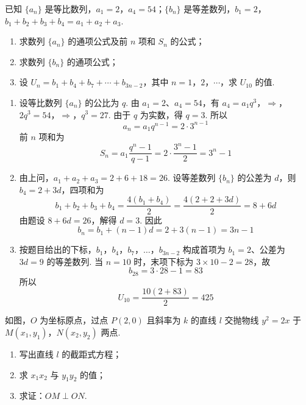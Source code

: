 \begin{problem}
已知 \(\{a_n\}\) 是等比数列，\(a_1=2\)，\(a_4=54\)；\(\{b_n\}\) 是等差数列，\(b_1=2\)，\(b_1+b_2+b_3+b_4=a_1+a_2+a_3\).

\begin{enumerate}
\item 求数列 \(\{a_n\}\) 的通项公式及前 \(n\) 项和 \(S_n\) 的公式；
\item 求数列 \(\{b_n\}\) 的通项公式；
\item 设 \(U_n=b_1+b_4+b_7+\cdots+b_{3n-2}\)，其中 \(n=1\)，\(2\)，\(\cdots\)，求 \(U_{10}\) 的值.
\end{enumerate}
\end{problem}

\begin{solution}
\begin{enumerate}
\item 设等比数列 \(\{a_n\}\) 的公比为 \(q\). 由 \(a_1=2\)、\(a_4=54\)，有
\(a_4=a_1q^3\)，\(\Longrightarrow\)，\(2q^3=54\)，\(\Longrightarrow\)，\(q^3=27\).
由于 \(q\) 为实数，得 \(q=3\). 所以
\[
a_n=a_1q^{n-1}=2\cdot3^{n-1}
\]
前 \(n\) 项和为
\[
S_n=a_1\frac{q^n-1}{q-1}=2\cdot\frac{3^n-1}{2}=3^n-1
\]
\item 由上问，\(a_1+a_2+a_3=2+6+18=26\). 设等差数列 \(\{b_n\}\) 的公差为 \(d\)，则 \(b_4=2+3d\)，四项和为
\[
b_1+b_2+b_3+b_4=\frac{4(b_1+b_4)}2=\frac{4(2+2+3d)}2=8+6d
\]
由题设 \(8+6d=26\)，解得 \(d=3\). 因此
\[
b_n=b_1+(n-1)d=2+3(n-1)=3n-1
\]
\item 按题目给出的下标，\(b_1\)，\(b_4\)，\(b_7\)，\(\ldots\)，\(b_{3n-2}\) 构成首项为 \(b_1=2\)、公差为 \(3d=9\) 的等差数列. 当 \(n=10\) 时，末项下标为 \(3\times10-2=28\)，故
\[
b_{28}=3\cdot28-1=83
\]
所以
\[
U_{10}=\frac{10(2+83)}{2}=425
\]
\end{enumerate}
\end{solution}

\begin{problem}
如图，\(O\) 为坐标原点，过点 \(P(2,0)\) 且斜率为 \(k\) 的直线 \(l\) 交抛物线 \(y^2=2x\) 于 \(M(x_1,y_1)\)，\(N(x_2,y_2)\) 两点.

\begin{enumerate}
\item 写出直线 \(l\) 的截距式方程；
\item 求 \(x_1x_2\) 与 \(y_1y_2\) 的值；
\item 求证：\(OM\perp ON\).
\end{enumerate}

\begin{center}
\end{center}
\end{problem}

